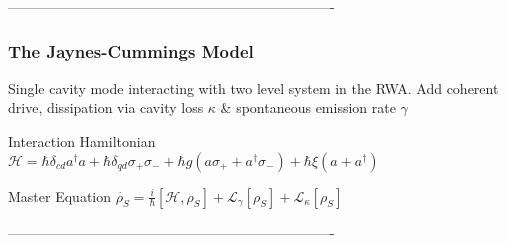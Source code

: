 \documentclass{beamer}
\begin{document}
----------------------------------------------------------------------
\begin{frame}
    \frametitle{The Jaynes-Cummings Model}
    \begin{center}
    \end{center}
    Single cavity mode interacting with two level system in the RWA.
    Add coherent drive, dissipation via cavity loss $\kappa$ \& 
    spontaneous emission rate $\gamma$
    \begin{block}{Interaction Hamiltonian}
        $
        \mathscr{H} = \hbar \delta_{cd} a^\dagger a + 
        \hbar \delta_{qd}\sigma_+ \sigma_- + 
        \hbar g ( a \sigma_+ + a^\dagger \sigma_- ) + 
        \hbar \xi (a + a^\dagger) 
        $
    \end{block}
    \begin{block}{Master Equation}
        $
        \dot{\rho_S} = \frac{i}{\hbar} [ \mathscr{H}, \rho_S ] +
        \mathscr{L}_{\gamma} [\rho_S] + \mathscr{L}_{\kappa}[ \rho_S ]
        $
    \end{block}
\end{frame}
----------------------------------------------------------------------
\end{document}
